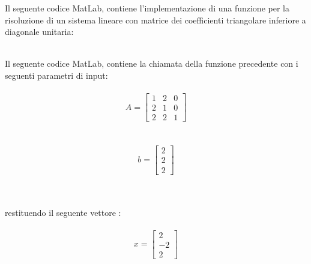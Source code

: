 Il seguente codice MatLab, contiene l'implementazione di una funzione per la risoluzione di un sistema lineare con matrice dei coefficienti triangolare inferiore a diagonale unitaria:\\\

Il seguente codice MatLab, contiene la chiamata della funzione precedente con i seguenti parametri di input:\\\
\[
A =\begin{bmatrix}
	1 & 2 & 0 \\ 
	2 & 1 & 0 \\
	2 & 2 & 1 
\end{bmatrix}
\]\\\	
\[
b =\begin{bmatrix}
  2 \\
  2 \\
  2
\end{bmatrix}
\]\\\

restituendo il seguente vettore :\\\
\[
x =\begin{bmatrix}
  2 \\
  -2 \\
  2
\end{bmatrix}
\]